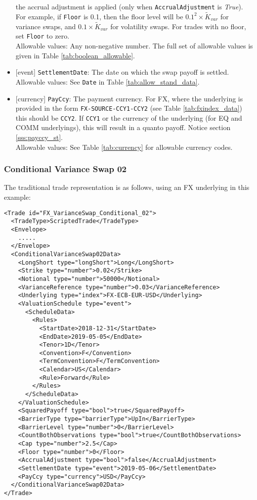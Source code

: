 \begin{itemize}
  the accrual adjustment is applied (only when \lstinline!AccrualAdjustment! is \emph{True}). For example,
  if \lstinline!Floor! is 0.1, then the floor level will be $0.1^2 \times \widetilde{K}_{var}$ for variance swaps, and
  $0.1 \times \widetilde{K}_{var}$ for volatility swaps. For trades with no floor, set
  \lstinline!Floor! to zero. \\
  Allowable values: Any non-negative number.
  The full set of allowable values is given in Table \ref{tab:boolean_allowable}.
  \item{}[event] \lstinline!SettlementDate!: The date on which the swap payoff is settled. \\
  Allowable values: See \lstinline!Date! in Table \ref{tab:allow_stand_data}.
  \item{}[currency] \lstinline!PayCcy!: The payment currency. For FX, where the underlying is provided
      in the form \lstinline!FX-SOURCE-CCY1-CCY2! (see Table \ref{tab:fxindex_data}) this should
      be \lstinline!CCY2!. If \lstinline!CCY1! or the currency of the underlying (for EQ and
      COMM underlyings), this will result in a quanto payoff. Notice section \ref{sss:payccy_st}. \\
        Allowable values: See Table \ref{tab:currency} for allowable currency codes.
\end{itemize}

\subsubsection*{Conditional Variance Swap 02}

The traditional trade representation is as follows, using an FX underlying in this example:

\begin{verbatim}
<Trade id="FX_VarianceSwap_Conditional_02">
  <TradeType>ScriptedTrade</TradeType>
  <Envelope>
    .....
  </Envelope>
  <ConditionalVarianceSwap02Data>
    <LongShort type="longShort">Long</LongShort>
    <Strike type="number">0.02</Strike>
    <Notional type="number">50000</Notional>
    <VarianceReference type="number">0.03</VarianceReference>
    <Underlying type="index">FX-ECB-EUR-USD</Underlying>
    <ValuationSchedule type="event">
      <ScheduleData>
        <Rules>
          <StartDate>2018-12-31</StartDate>
          <EndDate>2019-05-05</EndDate>
          <Tenor>1D</Tenor>
          <Convention>F</Convention>
          <TermConvention>F</TermConvention>
          <Calendar>US</Calendar>
          <Rule>Forward</Rule>
        </Rules>
      </ScheduleData>
    </ValuationSchedule>
    <SquaredPayoff type="bool">true</SquaredPayoff>
    <BarrierType type="barrierType">UpIn</BarrierType>
    <BarrierLevel type="number">0</BarrierLevel>
    <CountBothObservations type="bool">true</CountBothObservations>
    <Cap type="number">2.5</Cap>
    <Floor type="number">0</Floor>
    <AccrualAdjustment type="bool">false</AccrualAdjustment>
    <SettlementDate type="event">2019-05-06</SettlementDate>
    <PayCcy type="currency">USD</PayCcy>
  </ConditionalVarianceSwap02Data>
</Trade>
\end{verbatim}

